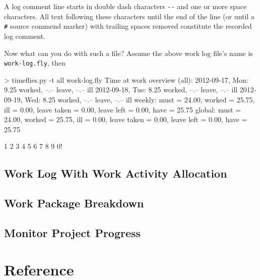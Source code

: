 \documentclass[11pt]{article}
\begin{document}
A log comment line starts in double dash characters \verb=--= and one or more space characters. All text following these characters until the end of the line (or until a \verb-#- source commend marker) with trailing spaces removed constitute the recorded log comment.

Now what can you do with such a file? Assume the above work log file's name is \verb:work-log.fly:, then

\begin{inputfile}
> timeflies.py -t all work-log.fly
Time at work overview (all):
2012-09-17, Mon:  9.25 worked, --.-- leave, --.-- ill
2012-09-18, Tue:  8.25 worked, --.-- leave, --.-- ill
2012-09-19, Wed:  8.25 worked, --.-- leave, --.-- ill
weekly: must =  24.00, worked =  25.75, ill =   0.00, leave taken =   0.00, leave left =   0.00, have =  25.75
global: must =  24.00, worked =  25.75, ill =   0.00, leave taken =   0.00, leave left =   0.00, have =  25.75
\end{inputfile}

1 2 3 4 5 6 7 8 9 0!

\subsection{Work Log With Work Activity Allocation}




\subsection{Work Package Breakdown}

\subsection{Monitor Project Progress}

\section{Reference}
\end{document}
